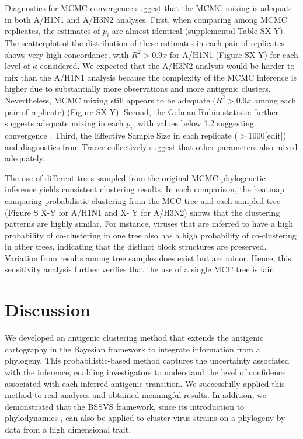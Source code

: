 \documentclass[11pt,oneside,letterpaper]{article}
\begin{document}
Diagnostics for MCMC convergence suggest that the MCMC mixing is adequate in both A/H1N1 and A/H3N2 analyses. 
First, when comparing among MCMC replicates, the estimates of $p_i$ are almost identical (supplemental Table SX-Y). 
The scatterplot of the distribution of these estimates in each pair of replicates shows very high concordance, with $R^2 > 0.9x$  for A/H1N1 (Figure SX-Y) for each level of $\kappa$ considered. 
We expected that the A/H3N2 analysis would be harder to mix than the A/H1N1 analysis because the complexity of the MCMC inference is higher due to substantially more observations and more antigenic clusters. 
Nevertheless, MCMC mixing still appears to be adequate ($R^2 > 0.9x$ among each pair of replicate) (Figure SX-Y). 
Second, the Gelman-Rubin statistic further suggests adequate mixing in each $p_i$, with values below 1.2  suggesting convergence \cite{Yang_evolutionbook}. 
Third, the Effective Sample Size in each replicate ($>1000$[edit]) and diagnostics from Tracer collectively suggest that other parameters also mixed adequately.

The use of different trees sampled from the original MCMC phylogenetic inference yields consistent clustering results. 
In each comparison, the heatmap comparing probabilistic clustering from the MCC tree and each sampled tree (Figure S X-Y  for A/H1N1 and X- Y for A/H3N2) shows that the clustering patterns are highly similar. 
For instance, viruses that are inferred to have a high probability of co-clustering in one tree also has a high probability of co-clustering in other trees, indicating that the distinct block structures are preserved. 
Variation from results among tree samples does exist but are minor. 
Hence, this sensitivity analysis further verifies that the use of a single MCC tree is fair.




\newpage

\section*{Discussion}

We developed an antigenic clustering method that extends the antigenic cartography in the Bayesian framework to integrate information from a phylogeny. 
This probabilistic-based method captures the uncertainty associated with the inference, enabling investigators to understand the level of confidence associated with each inferred antigenic transition. 
We successfully applied this method to real analyses and obtained meaningful results.
In addition, we demonstrated that the BSSVS framework, since its introduction to phylodynamics \cite{lemey_bayesian_2009, drummond_bayesian_2010}, can also be applied to cluster virus strains on a phylogeny by data from a high dimensional trait.  
\end{document}

